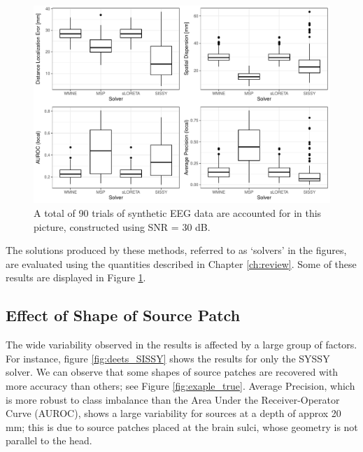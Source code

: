 \begin{figure}
    \centering
    \includegraphics[width=\linewidth]{img_stats/plot_EvalMetrics_Protocol04_30ALL.pdf}
    \caption{A total of 90 trials of synthetic EEG data are accounted for in this picture, constructed using SNR = 30 dB.}
    \label{fig:results1}
\end{figure}

The solutions produced by these methods, referred to as `solvers' in the figures, are evaluated using the quantities described in Chapter \ref{ch:review}.
%
Some of these results are displayed in Figure \ref{fig:results1}.

\subsection{Effect of Shape of Source Patch}

The wide variability observed in the results is affected by a large group of factors.
%
For instance, figure \ref{fig:deets_SISSY} shows the results for only the SYSSY solver.
%
We can observe that some shapes of source patches are recovered with more accuracy than others; see Figure \ref{fig:exaple_true}.
%
Average Precision, which is more robust to class imbalance than the Area Under the Receiver-Operator Curve (AUROC), shows a large variability for sources at a depth of approx 20 mm; this is due to source patches placed at the brain sulci, whose geometry is not parallel to the head.

